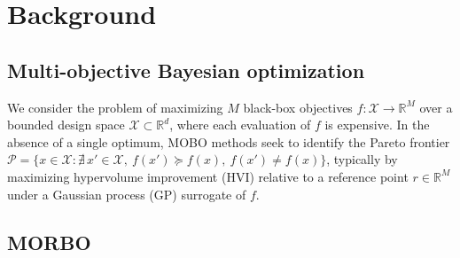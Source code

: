 \documentclass[11pt]{article}
\newcommand{\Reals}{\mathbb{R}}
\newcommand{\X}{\mathcal{X}}
\begin{document}
\begin{abstract}
per iteration, screened by MORBO's existing hypervolume-improvement
acquisition rather than accepted unconditionally. \emph{LLM-automated
tiered scalarization} is a standalone method (not built on MORBO's
trust-region machinery) that automates the specification of a BoTier-style
\citep{botier2025} hierarchical, priority-ordered scalarization via a
single LLM query, after which an ordinary single-objective Bayesian
optimization loop recovers one compromise point on the Pareto front
consistent with the inferred priorities. We give the precise mechanism,
integration points, and (where applicable) pseudocode for each, show the
composite and LLM-assisted extensions compose with each other and with
shape adaptation without new implementation, and report two follow-up
studies scoped around a specific prior-work finding: combining composite
modeling with MORBO is not itself new \citep{maddox2021hogp}, so we
isolate (i) whether the reported benefit is attributable to
correlation-aware raw-response modeling specifically or to simple
per-dimension decoupling, via a controlled ablation on a deliberately
correlated synthetic raw response, and (ii) whether composite modeling
helps on a composite structure drawn from a genuine black-box simulator (a
checkpointed fermentation trajectory) rather than a synthetic decomposition
of a closed-form test function.
\end{abstract}

\section{Background}

\subsection{Multi-objective Bayesian optimization}

We consider the problem of maximizing $M$ black-box objectives
$f: \X \to \Reals^M$ over a bounded design space $\X \subset \Reals^d$,
where each evaluation of $f$ is expensive. In the absence of a single
optimum, MOBO methods seek to identify the Pareto frontier
$\mathcal{P} = \{x \in \X : \nexists\, x' \in \X,\ f(x') \succeq f(x),\
f(x') \neq f(x)\}$,
typically by maximizing hypervolume improvement (HVI) relative to a
reference point $r \in \Reals^M$ under a Gaussian process (GP) surrogate
of $f$.

\subsection{MORBO}
\end{document}
